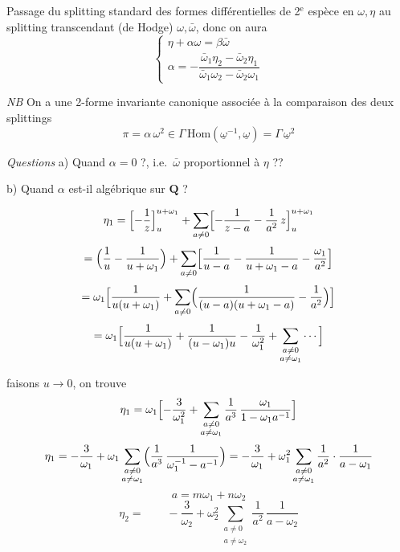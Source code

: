 \documentclass[11pt,a4paper]{article}
\begin{document}
Passage du splitting standard des formes différentielles de 2$^{\mathrm{e}}$
espèce en $\omega,\eta$ au splitting transcendant (de Hodge) $\omega,\bar\omega$,
donc on aura
\[
\begin{cases}
\eta + \alpha\omega = \beta\bar\omega\\[1mm]
\alpha = -\dfrac{\bar\omega_1\eta_2 - \bar\omega_2\eta_1}
{\bar\omega_1\omega_2 - \bar\omega_2\omega_1}
\end{cases}
\]

\emph{NB} On a une 2-forme invariante canonique associée à la comparaison
des deux splittings
\[
\pi = \alpha\,\omega^2 \in \Gamma\,\mathrm{Hom}(\underline{\omega}^{-1},
\underline{\omega}) = \Gamma\,\underline{\omega}^2
\]

\emph{Questions} a) Quand $\alpha=0$ ?, i.e.\ $\bar\omega$ proportionnel
à $\eta$ ??

b) Quand $\alpha$ est-il algébrique sur $\mathbf{Q}$ ?

\[
\eta_1 = \Bigl[-\frac1z\Bigr]_u^{u+\omega_1}
+ \sum_{a\neq 0}\Bigl[-\frac{1}{z-a} - \frac{1}{a^2}\,z\Bigr]_u^{u+\omega_1}
\]
\[
= \Bigl(\frac1u - \frac{1}{u+\omega_1}\Bigr)
+ \sum_{a\neq 0}\Bigl[\frac{1}{u-a} - \frac{1}{u+\omega_1-a}
- \frac{\omega_1}{a^2}\Bigr]
\]
\[
= \omega_1\Bigl[\frac{1}{u(u+\omega_1)}
+ \sum_{a\neq 0}\Bigl(\frac{1}{(u-a)(u+\omega_1-a)} - \frac{1}{a^2}\Bigr)\Bigr]
\]
\[
= \omega_1\Bigl[\frac{1}{u(u+\omega_1)} + \frac{1}{(u-\omega_1)u}
- \frac{1}{\omega_1^2} + \sum_{\substack{a\neq 0\\ a\neq\omega_1}}\cdots\Bigr]
\]

faisons $u\to 0$, on trouve
\[
\eta_1 = \omega_1\Bigl[-\frac{3}{\omega_1^2}
+ \sum_{\substack{a\neq 0\\ a\neq\omega_1}}\frac{1}{a^3}\,
\frac{\omega_1}{1-\omega_1a^{-1}}\Bigr]
\]
\[
\eta_1 = -\frac{3}{\omega_1} + \omega_1\sum_{\substack{a\neq 0\\ a\neq\omega_1}}
\Bigl(\frac{1}{a^3}\,\frac{1}{\omega_1^{-1}-a^{-1}}\Bigr)
= -\frac{3}{\omega_1} + \omega_1^2\sum_{\substack{a\neq 0\\ a\neq\omega_1}}
\frac{1}{a^2}\cdot\frac{1}{a-\omega_1}
\]
\[
a = m\omega_1 + n\omega_2
\]
\[
\eta_2 = \qquad -\frac{3}{\omega_2} + \omega_2^2\sum_{\substack{a\neq 0\\ a\neq\omega_2}}
\frac{1}{a^2}\,\frac{1}{a-\omega_2}
\]
\end{document}
